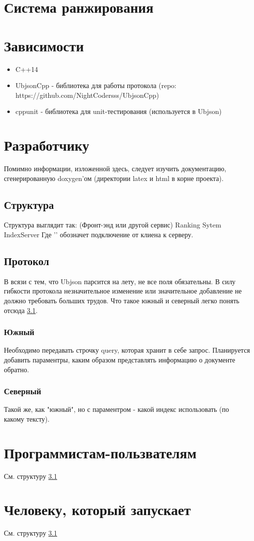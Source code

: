 \documentclass[12pt,a4paper]{scrartcl}
\begin{document}
\section{Система ранжирования}



\section{Зависимости}

\begin{itemize}
    \item C++14
    \item UbjsonCpp  - библиотека для работы протокола (repo: https://github.com/NightCodersss/UbjsonCpp)
    \item cppunit - библиотека для unit-тестирования (используется в Ubjson)
\end{itemize}

\section{Разработчику}
Помимно информации, изложенной здесь, следует изучить документацию, сгенерированную doxygen'ом (директории latex и html в корне проекта).

\subsection{Структура}
\label{subsec:generalStructure}
Структура выглядит так:
(Фронт-энд или другой сервис)  Ranking Sytem  IndexServer
Где '\rightarrow' обозначет подключение от клиена к серверу.

\subsection{Протокол}
В всязи с тем, что Ubjson парсится на лету, не все поля обязательны. 
В силу гибкости протокола незначительное изменение или значительное добавление не должно требовать больших трудов.
Что такое южный и северный легко понять отсюда \ref{subsec:generalStructure}.

\subsubsection{Южный}
Необходимо передавать строчку query, которая хранит в себе запрос.
Планируется добавить параментры, каким образом представлять информацию о документе обратно.

\subsubsection{Северный}
Такой же, как "южный", но с параментром - какой индекс использовать (по какому тексту). 

\section{Программистам-пользвателям}
См. структуру \ref{subsec:generalStructure}

\section{Человеку, который запускает}
См. структуру \ref{subsec:generalStructure}
\end{document}
